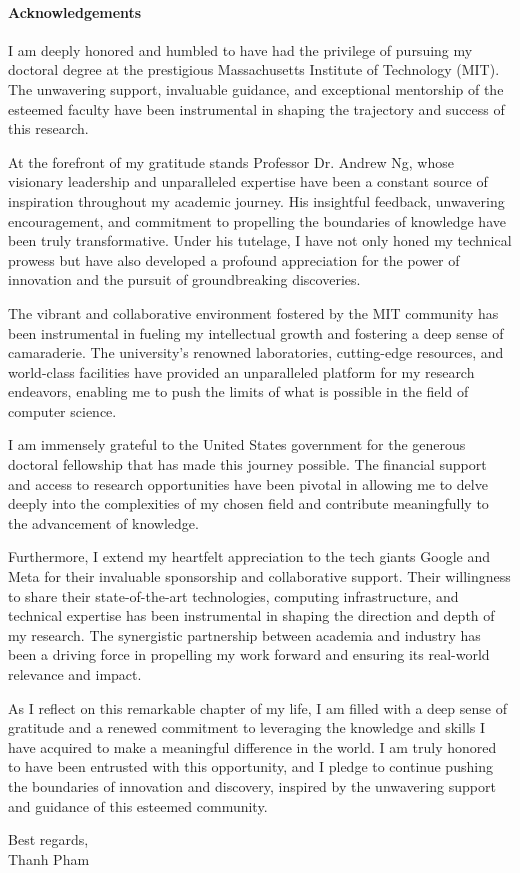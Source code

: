 \paragraph{\Large Acknowledgements\\[0.5cm]}
{I am deeply honored and humbled to have had the privilege of pursuing my doctoral degree at the prestigious Massachusetts Institute of Technology (MIT). The unwavering support, invaluable guidance, and exceptional mentorship of the esteemed faculty have been instrumental in shaping the trajectory and success of this research.

At the forefront of my gratitude stands Professor Dr. Andrew Ng, whose visionary leadership and unparalleled expertise have been a constant source of inspiration throughout my academic journey. His insightful feedback, unwavering encouragement, and commitment to propelling the boundaries of knowledge have been truly transformative. Under his tutelage, I have not only honed my technical prowess but have also developed a profound appreciation for the power of innovation and the pursuit of groundbreaking discoveries.

The vibrant and collaborative environment fostered by the MIT community has been instrumental in fueling my intellectual growth and fostering a deep sense of camaraderie. The university's renowned laboratories, cutting-edge resources, and world-class facilities have provided an unparalleled platform for my research endeavors, enabling me to push the limits of what is possible in the field of computer science.

I am immensely grateful to the United States government for the generous doctoral fellowship that has made this journey possible. The financial support and access to research opportunities have been pivotal in allowing me to delve deeply into the complexities of my chosen field and contribute meaningfully to the advancement of knowledge.

Furthermore, I extend my heartfelt appreciation to the tech giants Google and Meta for their invaluable sponsorship and collaborative support. Their willingness to share their state-of-the-art technologies, computing infrastructure, and technical expertise has been instrumental in shaping the direction and depth of my research. The synergistic partnership between academia and industry has been a driving force in propelling my work forward and ensuring its real-world relevance and impact.

As I reflect on this remarkable chapter of my life, I am filled with a deep sense of gratitude and a renewed commitment to leveraging the knowledge and skills I have acquired to make a meaningful difference in the world. I am truly honored to have been entrusted with this opportunity, and I pledge to continue pushing the boundaries of innovation and discovery, inspired by the unwavering support and guidance of this esteemed community.
}


\hfill
\begin{minipage}[t]{0.5\textwidth}\raggedright
Best regards,\\
Thanh Pham
\end{minipage}
